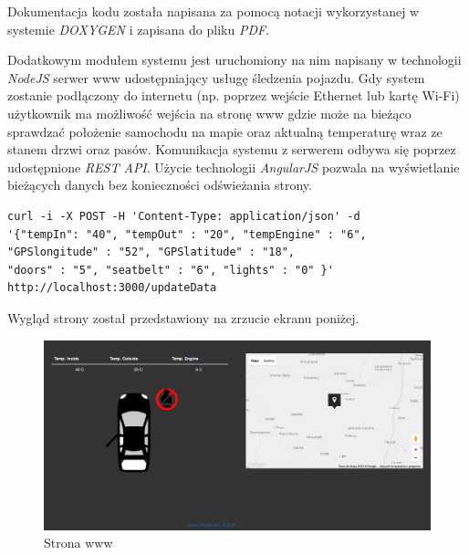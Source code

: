 \documentclass{xmgr}
\begin{document}
Dokumentacja kodu została napisana za pomocą notacji wykorzystanej w systemie \emph{DOXYGEN} i zapisana do pliku \emph{PDF}.

Dodatkowym modułem systemu jest uruchomiony na nim napisany w technologii \emph{NodeJS} serwer www udostępniający usługę śledzenia pojazdu. Gdy system zostanie podłączony do internetu (np. poprzez wejście Ethernet lub kartę Wi-Fi) użytkownik ma możliwość wejścia na stronę www gdzie może na bieżąco sprawdzać położenie samochodu na mapie oraz aktualną temperaturę wraz ze stanem drzwi oraz pasów. Komunikacja systemu z serwerem odbywa się poprzez udostępnione \emph{REST API}. Użycie technologii \emph{AngularJS} pozwala na wyświetlanie bieżących danych bez konieczności odświeżania strony.

\begin{lstlisting}[label=bot-dirs-alg,caption=Request wysyłany do serwera www]
curl -i -X POST -H 'Content-Type: application/json' -d 
'{"tempIn": "40", "tempOut" : "20", "tempEngine" : "6", 
"GPSlongitude" : "52", "GPSlatitude" : "18", 
"doors" : "5", "seatbelt" : "6", "lights" : "0" }' 
http://localhost:3000/updateData
\end{lstlisting}

Wygląd strony został przedstawiony na zrzucie ekranu poniżej.
\begin{figure}[!h]
    \centering
    	\includegraphics[height=0.35\textheight]{images/www.png}
    \caption{Strona www}
\end{figure}
\end{document}
